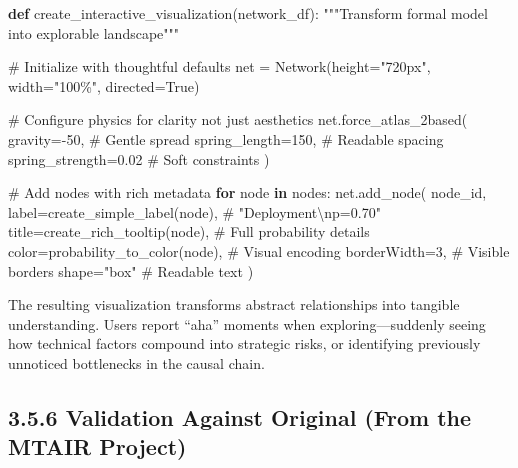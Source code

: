 \documentclass[
  11pt,
  letterpaper,
]{book}
\newenvironment{Shaded}{\begin{snugshade}}{\end{snugshade}}
\newcommand{\CommentTok}[1]{\textcolor[rgb]{0.37,0.37,0.37}{#1}}
\newcommand{\ControlFlowTok}[1]{\textcolor[rgb]{0.00,0.23,0.31}{\textbf{#1}}}
\newcommand{\DecValTok}[1]{\textcolor[rgb]{0.68,0.00,0.00}{#1}}
\newcommand{\FloatTok}[1]{\textcolor[rgb]{0.68,0.00,0.00}{#1}}
\newcommand{\KeywordTok}[1]{\textcolor[rgb]{0.00,0.23,0.31}{\textbf{#1}}}
\newcommand{\NormalTok}[1]{\textcolor[rgb]{0.00,0.23,0.31}{#1}}
\newcommand{\OperatorTok}[1]{\textcolor[rgb]{0.37,0.37,0.37}{#1}}
\newcommand{\StringTok}[1]{\textcolor[rgb]{0.13,0.47,0.30}{#1}}
\newcommand{\VariableTok}[1]{\textcolor[rgb]{0.07,0.07,0.07}{#1}}
\begin{document}
\begin{Shaded}
\begin{Highlighting}[]
\KeywordTok{def}\NormalTok{ create\_interactive\_visualization(network\_df):}
    \CommentTok{"""Transform formal model into explorable landscape"""}
    
    \CommentTok{\# Initialize with thoughtful defaults}
\NormalTok{    net }\OperatorTok{=}\NormalTok{ Network(height}\OperatorTok{=}\StringTok{"720px"}\NormalTok{, width}\OperatorTok{=}\StringTok{"100\%"}\NormalTok{, directed}\OperatorTok{=}\VariableTok{True}\NormalTok{)}
    
    \CommentTok{\# Configure physics for clarity not just aesthetics}
\NormalTok{    net.force\_atlas\_2based(}
\NormalTok{        gravity}\OperatorTok{={-}}\DecValTok{50}\NormalTok{,      }\CommentTok{\# Gentle spread}
\NormalTok{        spring\_length}\OperatorTok{=}\DecValTok{150}\NormalTok{,  }\CommentTok{\# Readable spacing}
\NormalTok{        spring\_strength}\OperatorTok{=}\FloatTok{0.02}  \CommentTok{\# Soft constraints}
\NormalTok{    )}
    
    \CommentTok{\# Add nodes with rich metadata}
    \ControlFlowTok{for}\NormalTok{ node }\KeywordTok{in}\NormalTok{ nodes:}
\NormalTok{        net.add\_node(}
\NormalTok{            node\_id,}
\NormalTok{            label}\OperatorTok{=}\NormalTok{create\_simple\_label(node),      }\CommentTok{\# "Deployment\textbackslash{}np=0.70"}
\NormalTok{            title}\OperatorTok{=}\NormalTok{create\_rich\_tooltip(node),      }\CommentTok{\# Full probability details}
\NormalTok{            color}\OperatorTok{=}\NormalTok{probability\_to\_color(node),     }\CommentTok{\# Visual encoding}
\NormalTok{            borderWidth}\OperatorTok{=}\DecValTok{3}\NormalTok{,                        }\CommentTok{\# Visible borders}
\NormalTok{            shape}\OperatorTok{=}\StringTok{"box"}                          \CommentTok{\# Readable text}
\NormalTok{        )}
\end{Highlighting}
\end{Shaded}

The resulting visualization transforms abstract relationships into
tangible understanding. Users report ``aha'' moments when
exploring---suddenly seeing how technical factors compound into
strategic risks, or identifying previously unnoticed bottlenecks in the
causal chain.

\subsection{3.5.6 Validation Against Original (From the MTAIR
Project)}\label{sec-carlsmith-validation}
\end{document}
